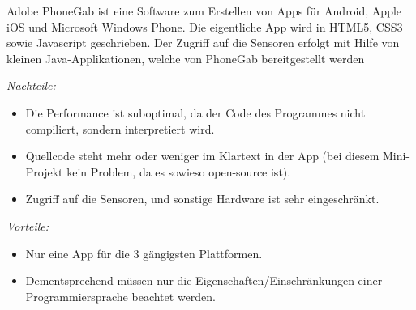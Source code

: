 Adobe PhoneGab ist eine Software zum Erstellen von Apps für Android, Apple iOS und Microsoft Windows Phone. Die eigentliche App wird in HTML5, CSS3 sowie Javascript geschrieben. Der Zugriff auf die Sensoren erfolgt mit Hilfe von kleinen Java-Applikationen, welche von PhoneGab bereitgestellt werden

\textit{Nachteile:}
\begin{itemize}
	\item Die Performance ist suboptimal, da der Code des Programmes nicht compiliert, sondern interpretiert wird.
	\item Quellcode steht mehr oder weniger im Klartext in der App (bei diesem Mini-Projekt kein Problem, da es sowieso open-source ist).
	\item Zugriff auf die Sensoren, und sonstige Hardware ist sehr eingeschränkt.
\end{itemize}
\textit{Vorteile:}
\begin{itemize}
	\item Nur eine App für die 3 gängigsten Plattformen.
	\item Dementsprechend müssen nur die Eigenschaften/Einschränkungen einer Programmiersprache beachtet werden.
\end{itemize}
